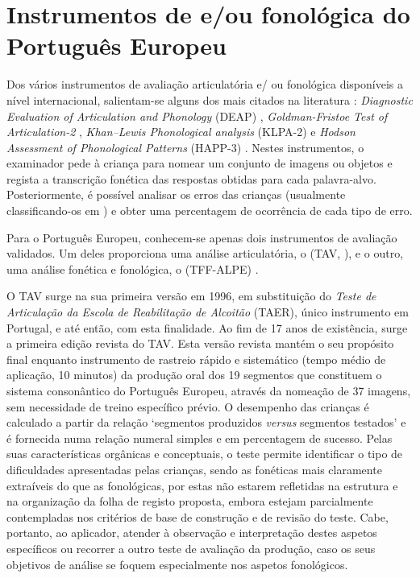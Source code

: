 \documentclass[output=paper]{LSP/langsci}
\begin{document}
\section{Instrumentos de  e/ou fonológica do Português Europeu}
\label{sec:lousada_instru_pt}

Dos vários instrumentos de avaliação articulatória e/ ou fonológica disponíveis a nível internacional, salientam-se alguns dos mais citados na literatura \citep{bowen2015}: \textit{Diagnostic Evaluation of Articulation and Phonology} (DEAP) \cite{dodd_etal2002}, \textit{Goldman-Fristoe Test of Articulation-2} \citep{goldmanfristoe2000}, \textit{Khan–Lewis Phonological analysis} (KLPA-2) \citep{khanlewis2002} e \textit{Hodson Assessment of Phonological Patterns} (HAPP-3) \citep{hodson2004}. Nestes instrumentos, o examinador pede à criança para nomear um conjunto de imagens ou objetos e regista a transcrição fonética das respostas obtidas para cada palavra-alvo. Posteriormente, é possível analisar os erros das crianças (usualmente classificando-os em ) e obter uma percentagem de ocorrência de cada tipo de erro.

Para o Português Europeu, conhecem-se apenas dois instrumentos de avaliação validados. Um deles proporciona uma análise articulatória, o \textit{} (TAV, \citealt{guimaraes_etal2014}), e o outro, uma análise fonética e fonológica, o \textit{} (TFF-ALPE) \citep{mendes_etal2013}. 

O TAV surge na sua primeira versão em 1996, em substituição do \textit{Teste de Articulação da Escola de Reabilitação de Alcoitão} (TAER), único instrumento em Portugal, e até então, com esta finalidade. Ao fim de 17 anos de existência, surge a primeira edição revista do TAV. Esta versão revista mantém o seu propósito final enquanto instrumento de rastreio rápido e sistemático (tempo médio de aplicação, 10 minutos) da produção oral dos 19 segmentos que constituem o sistema consonântico do Português Europeu, através da nomeação de 37 imagens, sem necessidade de treino específico prévio. O desempenho das crianças é calculado a partir da relação ‘segmentos produzidos \textit{versus} segmentos testados’ e é fornecida numa relação numeral simples e em percentagem de sucesso. Pelas suas características orgânicas e conceptuais, o teste permite identificar o tipo de dificuldades apresentadas pelas crianças, sendo as fonéticas mais claramente extraíveis do que as fonológicas, por estas não estarem refletidas na estrutura e na organização da folha de registo proposta, embora estejam parcialmente contempladas nos critérios de base de construção e de revisão do teste. Cabe, portanto, ao aplicador, atender à observação e interpretação destes aspetos específicos ou recorrer a outro teste de avaliação da produção, caso os seus objetivos de análise se foquem especialmente nos aspetos fonológicos.
\end{document}
